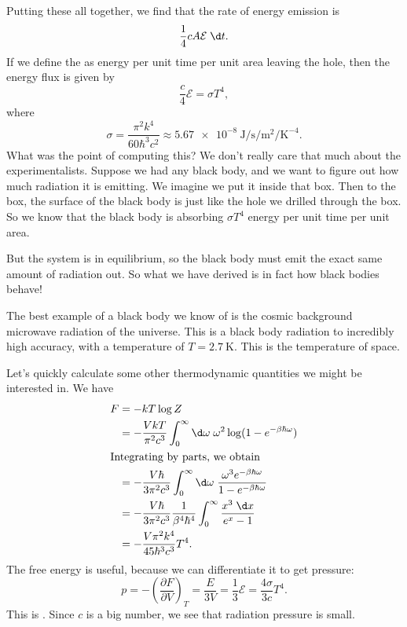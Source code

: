 \documentclass[a4paper]{article}
\begin{document}
Putting these all together, we find that the rate of energy emission is
\[
  \frac{1}{4} cA \mathcal{E} \;\d t.
\]
If we define the  as energy per unit time per unit area leaving the hole, then the energy flux is given by
\[
  \frac{c}{4} \mathcal{E} = \sigma T^4,
\]
where
\[
  \sigma = \frac{\pi^2 k^4}{60 \hbar^3 c^2} \approx \SI{5.67e-8}{\joule\per\second\per\meter\squared\per\kelvin\tothe{-4}}.
\]
What was the point of computing this? We don't really care that much about the experimentalists. Suppose we had any black body, and we want to figure out how much radiation it is emitting. We imagine we put it inside that box. Then to the box, the surface of the black body is just like the hole we drilled through the box. So we know that the black body is absorbing $\sigma T^4$ energy per unit time per unit area.

But the system is in equilibrium, so the black body must emit the exact same amount of radiation out. So what we have derived is in fact how black bodies behave!

The best example of a black body we know of is the cosmic background microwave radiation of the universe. This is a black body radiation to incredibly high accuracy, with a temperature of $T = \SI{2.7}{\kelvin}$. This is the temperature of space.

Let's quickly calculate some other thermodynamic quantities we might be interested in. We have
\begin{align*}
  F &= - kT \log Z\\
  &= -\frac{VkT}{\pi^2 c^3}\int_0^\infty \d \omega\; \omega^2 \log (1 - e^{-\beta \hbar \omega})\\
  \intertext{Integrating by parts, we obtain}
  &= -\frac{V \hbar}{3\pi^2 c^3}\int_0^\infty \d \omega\; \frac{\omega^3 e^{-\beta \hbar \omega}}{1 - e^{-\beta \hbar \omega}}\\
  &= - \frac{V \hbar}{3\pi^2 c^3} \frac{1}{\beta^4 \hbar^4} \int_0^\infty \frac{x^3 \;\d x}{e^x - 1} \\
  &= - \frac{V \pi^2 k^4}{45 \hbar^3 c^3}T^4.
\end{align*}
The free energy is useful, because we can differentiate it to get pressure:
\[
  p = - \left(\frac{\partial F}{\partial V}\right)_T = \frac{E}{3V} = \frac{1}{3}\mathcal{E} = \frac{4\sigma}{3c} T^4.
\]
This is . Since $c$ is a big number, we see that radiation pressure is small.
\end{document}
